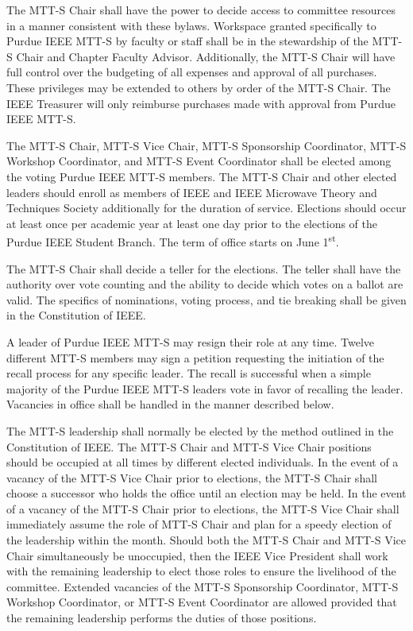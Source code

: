 \documentclass[12pt]{constitution}
\newcommand{\datetermstart}{June 1\textsuperscript{st}} %
\begin{document}
The MTT-S Chair shall have the power to decide access to committee resources in a manner consistent with these bylaws. Workspace granted specifically to Purdue IEEE MTT-S by faculty or staff shall be in the stewardship of the MTT-S Chair and Chapter Faculty Advisor. Additionally, the MTT-S Chair will have full control over the budgeting of all expenses and approval of all purchases. These privileges may be extended to others by order of the MTT-S Chair. The IEEE Treasurer will only reimburse purchases made with approval from Purdue IEEE MTT-S.


\label{art:electdepart}

The MTT-S Chair, MTT-S Vice Chair, MTT-S Sponsorship Coordinator, MTT-S Workshop Coordinator, and MTT-S Event Coordinator shall be elected among the voting Purdue IEEE MTT-S members. The MTT-S Chair and other elected leaders should enroll as members of IEEE and IEEE Microwave Theory and Techniques Society additionally for the duration of service. Elections should occur at least once per academic year at least one day prior to the elections of the Purdue IEEE Student Branch. The term of office starts on \datetermstart{}.

The MTT-S Chair shall decide a teller for the elections. The teller shall have the authority over vote counting and the ability to decide which votes on a ballot are valid. The specifics of nominations, voting process, and tie breaking shall be given in the Constitution of IEEE.

A leader of Purdue IEEE MTT-S may resign their role at any time. Twelve different MTT-S members may sign a petition requesting the initiation of the recall process for any specific leader. The recall is successful when a simple majority of the Purdue IEEE MTT-S leaders vote in favor of recalling the leader. Vacancies in office shall be handled in the manner described below.

The MTT-S leadership shall normally be elected by the method outlined in the Constitution of IEEE. The MTT-S Chair and MTT-S Vice Chair positions should be occupied at all times by different elected individuals. In the event of a vacancy of the MTT-S Vice Chair prior to elections, the MTT-S Chair shall choose a successor who holds the office until an election may be held. In the event of a vacancy of the MTT-S Chair prior to elections, the MTT-S Vice Chair shall immediately assume the role of MTT-S Chair and plan for a speedy election of the leadership within the month. Should both the MTT-S Chair and MTT-S Vice Chair simultaneously be unoccupied, then the IEEE Vice President shall work with the remaining leadership to elect those roles to ensure the livelihood of the committee. Extended vacancies of the MTT-S Sponsorship Coordinator, MTT-S Workshop Coordinator, or MTT-S Event Coordinator are allowed provided that the remaining leadership performs the duties of those positions.
\end{document}
